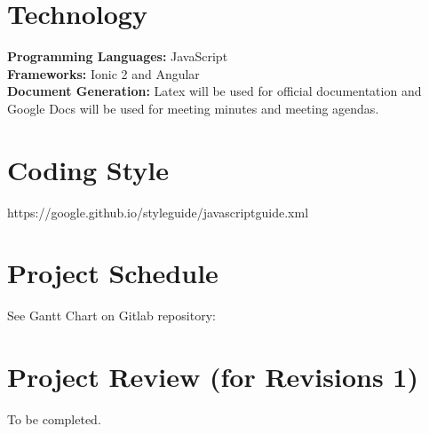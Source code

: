 \documentclass[12pt,fleqn]{article}
\begin{document}
\section {Technology}
\textbf{Programming Languages: }JavaScript \\ 
\textbf{Frameworks: }Ionic 2 and Angular \\
\textbf{Document Generation: } Latex will be used for official documentation and Google Docs will be used for meeting minutes and meeting agendas. 

\section {Coding Style}
 https://google.github.io/styleguide/javascriptguide.xml

\section {Project Schedule}
See Gantt Chart on Gitlab repository: \url{}


\section {Project Review (for Revisions 1)}
To be completed.
\end{document}

